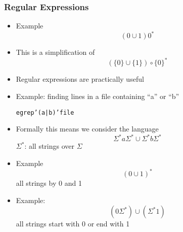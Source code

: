 




\begin{frame}[allowframebreaks] \frametitle{Regular Expressions}
  \begin{itemize}
\item Example
  \begin{equation*}
    (0 \cup 1) 0^*
  \end{equation*}
\item This is a simplification of 
  \begin{equation*}
    (\{0\}\cup \{1\})\circ \{0\}^*
  \end{equation*}
\item Regular expressions are practically useful
\item [] Example: finding lines in a file containing ``a'' or ``b''

  \begin{alltt}
    egrep '(a|b)' file
  \end{alltt}

\item Formally this means we consider the language
  \begin{equation*}
  \Sigma^* a \Sigma^* \cup
\Sigma^* b \Sigma^*
\end{equation*}
$\Sigma^*$: all strings over $\Sigma$
\item Example
  \begin{equation*}
    (0\cup 1)^*
  \end{equation*}
all strings by 0 and 1
\item Example:
  \begin{equation*}
    (0\Sigma^*)\cup (\Sigma^*1)
  \end{equation*}
all strings start with 0 or end with 1
\end{itemize}\end{frame}
